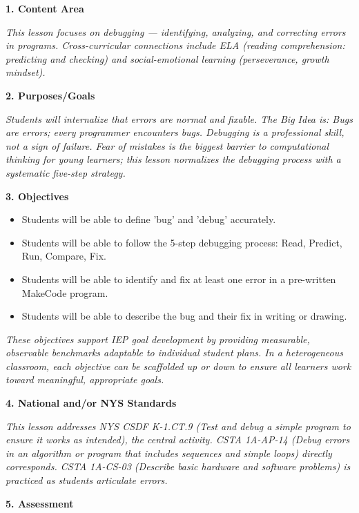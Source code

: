 \documentclass[11pt,letterpaper]{article}
\begin{document}
\textbf{1. Content Area}

\textit{This lesson focuses on debugging --- identifying, analyzing, and correcting errors in programs. Cross-curricular connections include ELA (reading comprehension: predicting and checking) and social-emotional learning (perseverance, growth mindset).}

\textbf{2. Purposes/Goals}

\textit{Students will internalize that errors are normal and fixable. The Big Idea is: Bugs are errors; every programmer encounters bugs. Debugging is a professional skill, not a sign of failure. Fear of mistakes is the biggest barrier to computational thinking for young learners; this lesson normalizes the debugging process with a systematic five-step strategy.}

\textbf{3. Objectives}

\begin{itemize}
  \item Students will be able to define 'bug' and 'debug' accurately.

  \item Students will be able to follow the 5-step debugging process: Read, Predict, Run, Compare, Fix.

  \item Students will be able to identify and fix at least one error in a pre-written MakeCode program.

  \item Students will be able to describe the bug and their fix in writing or drawing.
\end{itemize}

\textit{These objectives support IEP goal development by providing measurable, observable benchmarks adaptable to individual student plans. In a heterogeneous classroom, each objective can be scaffolded up or down to ensure all learners work toward meaningful, appropriate goals.}

\textbf{4. National and/or NYS Standards}

\textit{This lesson addresses NYS CSDF K-1.CT.9 (Test and debug a simple program to ensure it works as intended), the central activity. CSTA 1A-AP-14 (Debug errors in an algorithm or program that includes sequences and simple loops) directly corresponds. CSTA 1A-CS-03 (Describe basic hardware and software problems) is practiced as students articulate errors.}

\textbf{5. Assessment}

\end{document}
